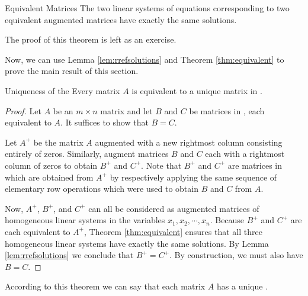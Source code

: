 \begin{theorem}{Equivalent Matrices}\label{thm:equivalent}
The two linear systems of equations corresponding to two equivalent augmented matrices have exactly the same solutions.
\end{theorem}

The proof of this theorem is left as an exercise. 

Now, we can use Lemma \ref{lem:rrefsolutions} and Theorem \ref{thm:equivalent} to prove the main result of this section.

\begin{theorem}{Uniqueness of the \RREF}\label{thm:uniquerref}
Every matrix $A$ is equivalent to a unique matrix in \rref.
\end{theorem}

\ifdefined\showproofs
\begin{proof}
Let $A$ be an $m \times n$ matrix and let $B$ and $C$ be matrices in \rref, each equivalent to $A$. It suffices to show that $B=C$.

Let $A^{+}$ be the matrix $A$ augmented with a new rightmost column consisting entirely of zeros. Similarly, augment matrices $B$ and $C$ each with a rightmost column of zeros to obtain $B^{+}$ and $C^{+}$. Note that $B^{+}$ and $C^{+}$
are matrices in \rref \;which are obtained from $A^{+}$ by respectively applying the same sequence of elementary row operations which were used to obtain $B$ and $C$ from $A$. 

Now, $A^{+}$, $B^{+}$, and $C^{+}$ can all be considered as augmented matrices of homogeneous linear systems in the variables $x_1, x_2, \cdots, x_n$. Because $B^{+}$ and $C^{+}$ are each equivalent to $A^{+}$, Theorem \ref{thm:equivalent} ensures that all three homogeneous linear systems have exactly the same solutions. By Lemma \ref{lem:rrefsolutions} we conclude that $B^{+}=C^{+}$. By construction, we must also have $B=C$. 
\end{proof}
\fi
According to this theorem we can say that each matrix $A$ has a unique \rref.